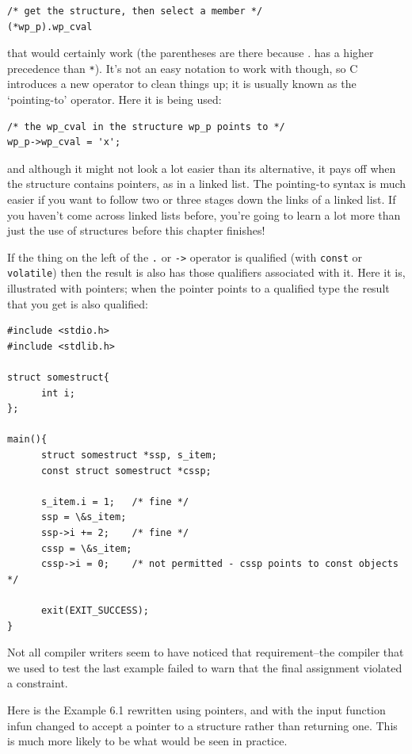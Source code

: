    \begin{Verbatim}
/* get the structure, then select a member */
(*wp_p).wp_cval
\end{Verbatim}

   that would certainly work (the parentheses are there because . has
    a higher precedence than \texttt{*}). It's not an easy notation to work
    with though, so C introduces a new operator to clean things up; it is
    usually known as the `pointing-to' operator. Here it is being
    used:


   \begin{Verbatim}
/* the wp_cval in the structure wp_p points to */
wp_p->wp_cval = 'x';
\end{Verbatim}

   and although it might not look a lot easier than its alternative, it pays
    off when the structure contains pointers, as in a linked list. The
    pointing-to syntax is much easier if you want to follow two or three stages
    down the links of a linked list. If you haven't come across linked lists
    before, you're going to learn a lot more than just the use of structures
    before this chapter finishes!


   If the thing on the left of the \texttt{.} or \texttt{->}
    operator is qualified (with \texttt{const} or \texttt{volatile})
    then the result is also has those qualifiers associated with it. Here it
    is, illustrated with pointers; when the pointer points to a qualified type
    the result that you get is also qualified:


   \begin{Verbatim}
#include <stdio.h>
#include <stdlib.h>

struct somestruct{
      int i;
};

main(){
      struct somestruct *ssp, s_item;
      const struct somestruct *cssp;

      s_item.i = 1;   /* fine */
      ssp = \&s_item;
      ssp->i += 2;    /* fine */
      cssp = \&s_item;
      cssp->i = 0;    /* not permitted - cssp points to const objects */

      exit(EXIT_SUCCESS);
}
\end{Verbatim}

   Not all compiler writers seem to have noticed that requirement--the
    compiler that we used to test the last example failed to warn that the
    final assignment violated a constraint.


   Here is the Example 6.1 rewritten using pointers, and with
    the input function infun changed to accept a pointer to a structure rather
    than returning one. This is much more likely to be what would be seen in
    practice.


